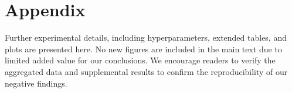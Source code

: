 \documentclass{article}
\begin{document}
\appendix
\section*{Appendix}
Further experimental details, including hyperparameters, extended tables, and plots are presented here. No new figures are included in the main text due to limited added value for our conclusions. We encourage readers to verify the aggregated data and supplemental results to confirm the reproducibility of our negative findings.


\end{document}
